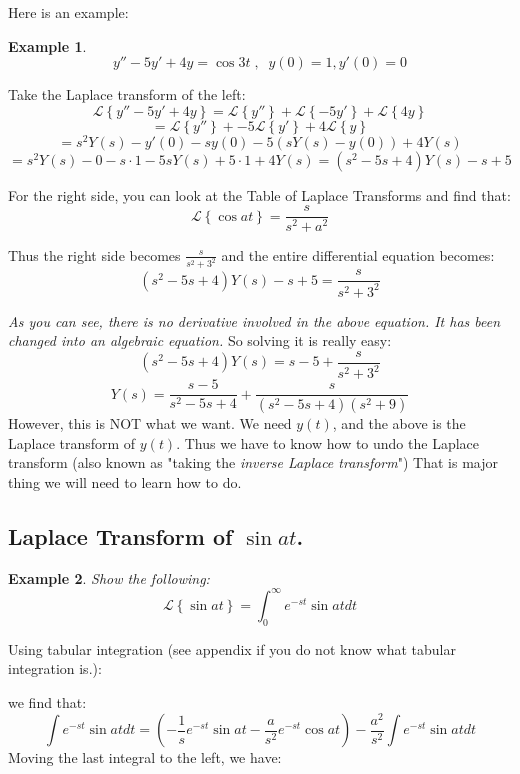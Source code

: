\documentclass[12pt]{report}
\newtheorem{ex}{Example}[section]
\begin{document}
Here is an example:
\begin{ex}
$$y''-5y'+4y= \cos 3t  \; , \; \; y(0)=1, y'(0)=0$$
\end{ex}
Take the Laplace transform of the left:
$$ \mathscr{L} \left\{y''-5y'+4y \right\}  =  \mathscr{L} \left\{y'' \right\}+ \mathscr{L} \left\{-5y' \right\}+ \mathscr{L} \left\{4y \right\}$$
$$=  \mathscr{L} \left\{y'' \right\}+ -5\mathscr{L} \left\{y' \right\}+ 4\mathscr{L} \left\{y \right\}$$
$$= s^2 Y(s) - y'(0) -s y(0) -5 \left( s Y(s) - y(0) \right) + 4Y(s)$$
$$ = s^2 Y(s) -0 -s\cdot 1 -5s Y(s) +5\cdot 1 + 4 Y(s) = (s^2 - 5s +4) Y(s) -s +5 $$

For the right side, you can look at the Table of Laplace Transforms and find that:
$$ \mathscr{L} \left\{ \cos at \right\} = \frac{s}{s^2 + a^2} $$

Thus the right side becomes $\frac{s}{s^2 + 3^2} $ and the entire differential equation becomes:
$$(s^2 - 5s +4) Y(s) -s +5 = \frac{s}{s^2 + 3^2} $$

\textit{As you can see, there is no derivative involved in the above equation. It has been changed into an algebraic equation. } So solving it is really easy:
$$(s^2 - 5s +4) Y(s) =s -5+ \frac{s}{s^2 + 3^2} $$
$$ Y(s) = \frac{s -5}{s^2 - 5s +4}+ \frac{s}{(s^2 - 5s +4)(s^2 + 9)} $$
However, this is NOT what we want. We need $y(t)$, and the above is the Laplace transform of $y(t)$. Thus we have to know how to undo the Laplace transform (also known as "taking the \textit{inverse Laplace transform}")
That is major thing we will need to learn how to do.

\subsection*{Laplace Transform of $\sin at $.}
\begin{ex} Show the following:
$$ \mathscr{L} \left\{ \sin at \right\}= \int_0^{\infty}  e^{-st} \sin at dt $$
\end{ex}
Using tabular integration (see appendix if you do not know what tabular integration is.):
\begin{center}  \end{center}
we find that:
$$\int  e^{-st} \sin at dt = \left( - \frac{1}{s} e^{-st} \sin at - \frac{a}{s^2} e^{-st} \cos at \right)  -\frac{a^2}{s^2} \int  e^{-st} \sin at dt$$
Moving the last integral to the left, we have:
\end{document}
